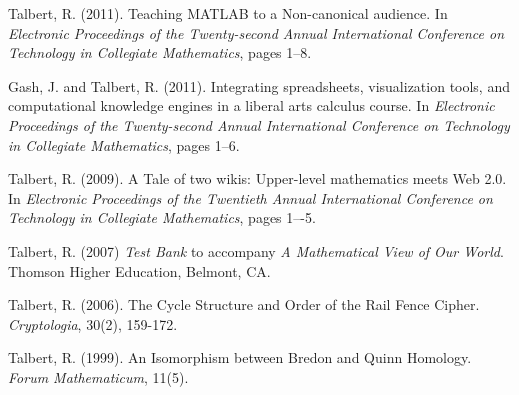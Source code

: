 \documentclass[letterpaper]{article}
\renewenvironment{itemize}{
  \begin{list}{}{
    \setlength{\leftmargin}{1.5em}
	\setlength{\itemsep}{0in}
  }
}{
  \end{list}
}
\begin{document}
\begin{itemize}
	\item Talbert, R. (2011). Teaching MATLAB to a Non-canonical audience. In \textit{Electronic Proceedings of the Twenty-second Annual International Conference on Technology in Collegiate Mathematics}, pages 1--8.
	\item Gash, J. and Talbert, R. (2011). Integrating spreadsheets, visualization tools, and computational knowledge engines in a liberal arts calculus course. In \textit{Electronic Proceedings of the Twenty-second Annual International Conference on Technology in Collegiate Mathematics}, pages 1--6.
	\item Talbert, R. (2009). A Tale of two wikis: Upper-level mathematics meets Web 2.0. In \textit{Electronic Proceedings of the Twentieth Annual International Conference on Technology in Collegiate Mathematics}, pages 1–-5.
	\item Talbert, R. (2007)  \emph{Test Bank} to accompany \emph{A Mathematical View of Our World}. Thomson Higher Education, Belmont, CA.
	\item Talbert, R. (2006). The Cycle Structure and Order of the Rail Fence Cipher. \textit{Cryptologia}, 30(2), 159-172.
	\item Talbert, R. (1999). An Isomorphism between Bredon and Quinn Homology. \textit{Forum Mathematicum}, 11(5).
\end{itemize}




% 
\end{document}
